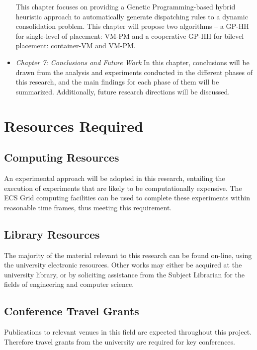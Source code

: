 \begin{itemize}
	This chapter focuses on providing a Genetic Programming-based hybrid heuristic approach to automatically generate dispatching rules to a dynamic consolidation problem. This chapter will propose two algorithms -- a GP-HH for single-level of placement: VM-PM and a cooperative GP-HH for bilevel placement: container-VM and VM-PM.
	\item \textit{Chapter 7: Conclusions and Future Work}
	In this chapter, conclusions will be drawn from the analysis and experiments conducted in the different phases of this research, and the main findings for each phase of them will be summarized. Additionally, future research directions will be discussed.

\end{itemize}


\section{Resources Required}
\subsection{Computing Resources}
An experimental approach will be adopted in this research, entailing the execution of experiments that are likely to be computationally expensive. The ECS Grid computing facilities
can be used to complete these experiments within reasonable time frames, thus meeting this requirement.
\subsection{Library Resources}
The majority of the material relevant to this research can be found on-line, using the university electronic resources. Other works may either be acquired at the university library, or
by soliciting assistance from the Subject Librarian for the fields of engineering and computer science.
\subsection{Conference Travel Grants}
Publications to relevant venues in this field are expected throughout this project. Therefore travel grants from the university are required for key conferences.